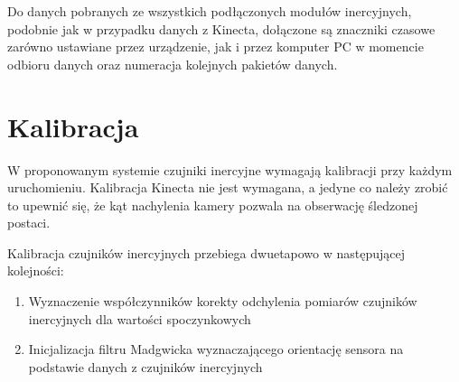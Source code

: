 Do danych pobranych ze wszystkich podłączonych modułów inercyjnych, podobnie jak w przypadku danych z Kinecta, dołączone są znaczniki czasowe zarówno ustawiane przez urządzenie, jak i przez komputer PC w momencie odbioru danych oraz numeracja kolejnych pakietów danych.

\section{Kalibracja}
W proponowanym systemie czujniki inercyjne wymagają kalibracji przy każdym uruchomieniu. Kalibracja Kinecta nie jest wymagana, a jedyne co należy zrobić to upewnić się, że kąt nachylenia kamery pozwala na obserwację śledzonej postaci.

Kalibracja czujników inercyjnych przebiega dwuetapowo w następującej kolejności:
\begin{enumerate}
	\item {Wyznaczenie współczynników korekty odchylenia pomiarów czujników inercyjnych dla wartości spoczynkowych} 
	\item {Inicjalizacja filtru Madgwicka wyznaczającego orientację sensora na podstawie danych z czujników inercyjnych}
\end{enumerate}

